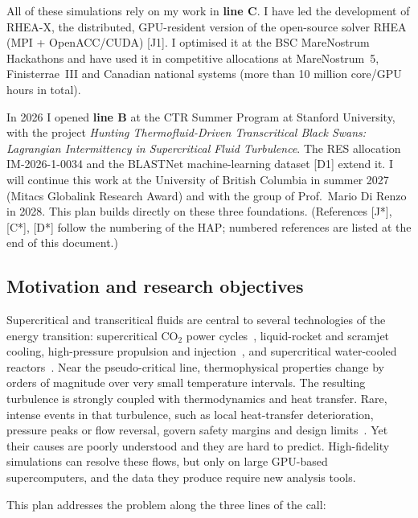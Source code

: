 \documentclass[11pt]{article}
\begin{document}
All of these simulations rely on my work in \textbf{line C}. I have led the development of
RHEA-X, the distributed, GPU-resident version of the open-source solver RHEA
(MPI + OpenACC/CUDA) [J1]. I optimised it at the BSC MareNostrum Hackathons and have used it
in competitive allocations at MareNostrum~5, Finisterrae~III and Canadian national
systems (more than 10 million core/GPU hours in total).

In 2026 I opened \textbf{line B} at the CTR Summer Program at Stanford University, with
the project \emph{Hunting Thermofluid-Driven Transcritical Black Swans: Lagrangian Intermittency in Supercritical Fluid Turbulence}. The RES allocation IM-2026-1-0034 and the BLASTNet machine-learning dataset [D1] extend it. I will
continue this work at the University of British Columbia in summer 2027 (Mitacs Globalink
Research Award) and with the group of Prof.\ Mario Di Renzo in 2028. This plan builds
directly on these three foundations. (References [J*], [C*], [D*] follow the numbering of
the HAP; numbered references are listed at the end of this document.)

\subsection{Motivation and research objectives}
Supercritical and transcritical fluids are central to several technologies of the
energy transition: supercritical CO$_2$ power cycles~\cite{Ahn2015}, liquid-rocket and
scramjet cooling, high-pressure propulsion and injection~\cite{JofreUrzay2021}, and
supercritical water-cooled reactors~\cite{Yoo2013}.
Near the pseudo-critical line, thermophysical properties change by orders of magnitude
over very small temperature intervals. The resulting turbulence is strongly coupled with
thermodynamics and heat transfer. Rare, intense events in that turbulence, such as local
heat-transfer deterioration, pressure peaks or flow reversal, govern safety margins and
design limits~\cite{Sapsis2021}. Yet their causes are poorly understood and they are hard to predict.
High-fidelity simulations can resolve these flows, but only on large GPU-based
supercomputers, and the data they produce require new analysis tools.

This plan addresses the problem along the three lines of the call:
\end{document}
